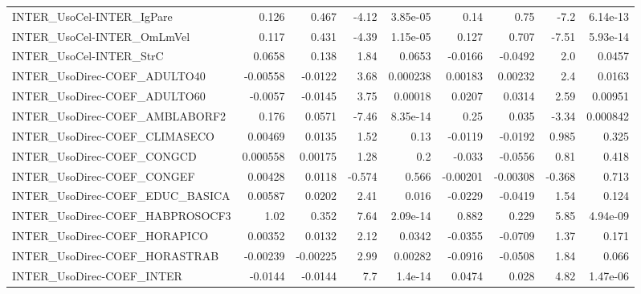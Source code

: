 \begin{tabular}{lrrrrrrrr}
INTER\_UsoCel-INTER\_IgPare              &       0.126 &        0.467 &    -4.12 & 3.85e-05 &       0.14 &        0.75 &         -7.2 &      6.14e-13 \\
INTER\_UsoCel-INTER\_OmLmVel             &       0.117 &        0.431 &    -4.39 & 1.15e-05 &      0.127 &       0.707 &        -7.51 &      5.93e-14 \\
INTER\_UsoCel-INTER\_StrC                &      0.0658 &        0.138 &     1.84 &   0.0653 &    -0.0166 &     -0.0492 &          2.0 &        0.0457 \\
INTER\_UsoDirec-COEF\_ADULTO40           &    -0.00558 &      -0.0122 &     3.68 & 0.000238 &    0.00183 &     0.00232 &          2.4 &        0.0163 \\
INTER\_UsoDirec-COEF\_ADULTO60           &     -0.0057 &      -0.0145 &     3.75 &  0.00018 &     0.0207 &      0.0314 &         2.59 &       0.00951 \\
INTER\_UsoDirec-COEF\_AMBLABORF2         &       0.176 &       0.0571 &    -7.46 & 8.35e-14 &       0.25 &       0.035 &        -3.34 &      0.000842 \\
INTER\_UsoDirec-COEF\_CLIMASECO          &     0.00469 &       0.0135 &     1.52 &     0.13 &    -0.0119 &     -0.0192 &        0.985 &         0.325 \\
INTER\_UsoDirec-COEF\_CONGCD             &    0.000558 &      0.00175 &     1.28 &      0.2 &     -0.033 &     -0.0556 &         0.81 &         0.418 \\
INTER\_UsoDirec-COEF\_CONGEF             &     0.00428 &       0.0118 &   -0.574 &    0.566 &   -0.00201 &    -0.00308 &       -0.368 &         0.713 \\
INTER\_UsoDirec-COEF\_EDUC\_BASICA        &     0.00587 &       0.0202 &     2.41 &    0.016 &    -0.0229 &     -0.0419 &         1.54 &         0.124 \\
INTER\_UsoDirec-COEF\_HABPROSOCF3        &        1.02 &        0.352 &     7.64 & 2.09e-14 &      0.882 &       0.229 &         5.85 &      4.94e-09 \\
INTER\_UsoDirec-COEF\_HORAPICO           &     0.00352 &       0.0132 &     2.12 &   0.0342 &    -0.0355 &     -0.0709 &         1.37 &         0.171 \\
INTER\_UsoDirec-COEF\_HORASTRAB          &    -0.00239 &     -0.00225 &     2.99 &  0.00282 &    -0.0916 &     -0.0508 &         1.84 &         0.066 \\
INTER\_UsoDirec-COEF\_INTER              &     -0.0144 &      -0.0144 &      7.7 &  1.4e-14 &     0.0474 &       0.028 &         4.82 &      1.47e-06 \\

\end{tabular}

